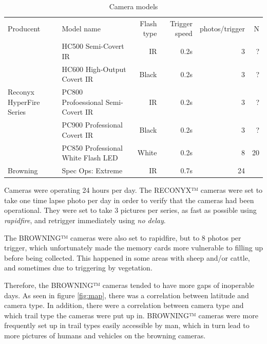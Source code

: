 \begin{table}
\caption{\label{tab:cam_mod} Camera models}
\centering

\begin{tabular}{llrrrr}
\hline
Producent  & Model name & Flash type & Trigger speed & photos/trigger & N \\
\cline{1-2}
\multirow{5}{2cm}{Reconyx HyperFire Series} &
	  HC500 Semi-Covert IR					& IR	& 0.2s & 3 & ? \\
	& HC600 High-Output Covert IR			& Black	& 0.2s & 3 & ? \\
    & PC800 Profoessional Semi-Covert IR 	& IR	& 0.2s & 3 & ? \\
    & PC900 Professional Covert IR 		& Black	& 0.2s & 3 & ? \\
    & PC850 Professional White Flash LED	& White	& 0.2s & 8 & 20 \\
\cline{1-2}
Browning  & Spec Ops: Extreme 				& IR	& 0.7s & ~ 24  \\
\hline
\end{tabular}

\end{table}






Cameras were operating 24 hours per day. The RECONYX™ cameras were set to take one time lapse photo per day in order to verify that the cameras had been operational.
They were set to take 3 pictures per series, as fast as possible using \emph{rapidfire}, and retrigger immediately using \emph{no delay}.

The BROWNING™ cameras were also set to rapidfire, but to 8 photos per trigger, which unfortunately made the memory cards more vulnerable to filling up before being collected. This happened in some areas with sheep and/or cattle, and sometimes due to triggering by vegetation.

Therefore, the BROWNING™ cameras tended to have more gaps of inoperable days.
As seen in figure \ref{fig:map}, %
there was a correlation between latitude and camera type.
In addition, there were a correlation between camera type and which trail type the cameras were put up in. BROWNING™ cameras were more frequently set up in trail types easily accessible by man, which in turn lead to more pictures of humans and vehicles on the browning cameras. %


